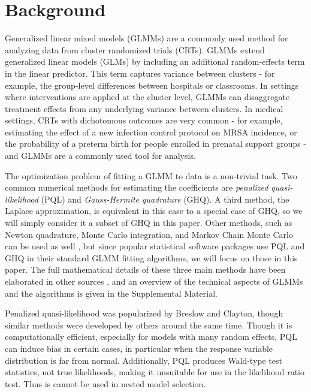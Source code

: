 \documentclass[Afour,times,sagev,doublespace]{sagej}
\begin{document}
\section{Background}
Generalized linear mixed models (GLMMs) are a commonly used method for analyzing data from cluster randomized trials (CRTs). GLMMs extend generalized linear models (GLMs) by including an additional random-effects term in the linear predictor. This term captures variance between clusters - for example, the group-level differences between hospitals or classrooms. In settings where interventions are applied at the cluster level, GLMMs can disaggregate treatment effects from any underlying variance between clusters. In medical settings, CRTs with dichotomous outcomes are very common - for example, estimating the effect of a new infection control protocol on MRSA incidence, or the probability of a preterm birth for people enrolled in prenatal support groups - and GLMMs are a commonly used tool for analysis. 

The optimization problem of fitting a GLMM to data is a non-trivial task. Two common numerical methods for estimating the coefficients are \textit{penalized quasi-likelihood} (PQL) \cite{wolfinger_generalized_1993} and \textit{Gauss-Hermite quadrature} (GHQ). A third method, the Laplace approximation, is equivalent in this case to a special case of GHQ\cite{liu_note_1994}, so we will simply consider it a subset of GHQ in this paper. Other methods, such as Newton quadrature, Monte Carlo integration, and Markov Chain Monte Carlo can be used as well \cite{zhang_fitting_2011}, but since popular statistical software packages use PQL and GHQ in their standard GLMM fitting algorithms, we will focus on those in this paper. The full mathematical details of these three main methods have been elaborated in other sources \cite{wolfinger_generalized_1993}\cite{pinheiro_efficient_2006}, and an overview of the technical aspects of GLMMs and the algorithms is given in the Supplemental Material.

Penalized quasi-likelihood was popularized by Breslow and Clayton\cite{breslow_approximate_1993}, though similar methods were developed by others\cite{zeger_models_1988}\cite{engel_simple_1994} around the same time. Though it is computationally efficient, especially for models with many random effects, PQL can induce bias in certain cases, in particular when the response variable distribution is far from normal\cite{agresti_categorical_2013}\cite{rodriguez_assessment_1995}\cite{breslow_bias_1995}\cite{lin_bias_1996}. Additionally, PQL produces Wald-type test statistics, not true likelihoods, making it unsuitable for use in the likelihood ratio test. Thus is cannot be used in nested model selection\cite{zhang_fitting_2011}\cite{pinheiro_efficient_2006}\cite{ng_estimation_2006}.
\end{document}
